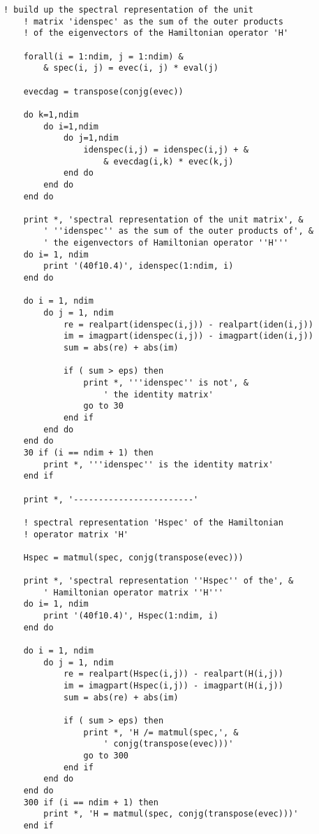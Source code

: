 \documentclass[12pt]{article}
\begin{document}
\begin{lstlisting}[frame=single,caption={{\tt Fortran 90} Code {\tt hrmosc.f90}},label=hrmosc]
    ! build up the spectral representation of the unit
    ! matrix 'idenspec' as the sum of the outer products 
    ! of the eigenvectors of the Hamiltonian operator 'H'

    forall(i = 1:ndim, j = 1:ndim) &
        & spec(i, j) = evec(i, j) * eval(j) 

    evecdag = transpose(conjg(evec))

    do k=1,ndim
        do i=1,ndim
            do j=1,ndim
                idenspec(i,j) = idenspec(i,j) + &
                    & evecdag(i,k) * evec(k,j)
            end do
        end do
    end do

    print *, 'spectral representation of the unit matrix', &
        ' ''idenspec'' as the sum of the outer products of', & 
        ' the eigenvectors of Hamiltonian operator ''H'''
    do i= 1, ndim
        print '(40f10.4)', idenspec(1:ndim, i)
    end do

    do i = 1, ndim
        do j = 1, ndim
            re = realpart(idenspec(i,j)) - realpart(iden(i,j))
            im = imagpart(idenspec(i,j)) - imagpart(iden(i,j))
            sum = abs(re) + abs(im)

            if ( sum > eps) then
                print *, '''idenspec'' is not', &
                    ' the identity matrix'
                go to 30
            end if
        end do
    end do
    30 if (i == ndim + 1) then
        print *, '''idenspec'' is the identity matrix'
    end if

    print *, '------------------------'

    ! spectral representation 'Hspec' of the Hamiltonian 
    ! operator matrix 'H'
    
    Hspec = matmul(spec, conjg(transpose(evec)))

    print *, 'spectral representation ''Hspec'' of the', &
        ' Hamiltonian operator matrix ''H'''
    do i= 1, ndim
        print '(40f10.4)', Hspec(1:ndim, i)
    end do

    do i = 1, ndim
        do j = 1, ndim
            re = realpart(Hspec(i,j)) - realpart(H(i,j))
            im = imagpart(Hspec(i,j)) - imagpart(H(i,j))
            sum = abs(re) + abs(im)

            if ( sum > eps) then
                print *, 'H /= matmul(spec,', &
                    ' conjg(transpose(evec)))'
                go to 300
            end if
        end do
    end do
    300 if (i == ndim + 1) then
        print *, 'H = matmul(spec, conjg(transpose(evec)))'
    end if


\end{lstlisting}
\end{document}
